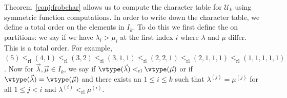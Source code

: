 Theorem~\ref{conj:frobchar} allows us to compute the character table for
$\mathcal{U}_k$ using symmetric function computations.
In order to write down the character table, we define a total order on the elements in $I_k$.  To do this we first define the 
on partitions: we say  if we have $\lambda_i > \mu_i$ at the first index $i$ where $\lambda$ and $\mu$ differ.
This is a total order. For example, $(5) \leqslant_{\mathrm{rl}} (4,1) \leqslant_{\mathrm{rl}} (3,2) \leqslant_{\mathrm{rl}} (3,1,1) \leqslant_{\mathrm{rl}} (2,2,1) \leqslant_{\mathrm{rl}} (2,1,1,1) \leqslant_{\mathrm{rl}} (1,1,1,1,1)$.
Now for $\vec{\lambda},\vec{\mu}\in I_k$, we say  if
$\vtype(\vec{\lambda}) <_{\mathrm{rl}} \vtype(\vec{\mu})$ or if $\vtype(\vec{\lambda}) = \vtype(\vec{\mu})$ and there exists an
$1 \leqslant i \leqslant k$ such that $\lambda^{(j)} = \mu^{(j)}$ for all $1 \leqslant j < i$ and
$\lambda^{(i)} <_{\mathrm{rl}} \mu^{(i)}$.

